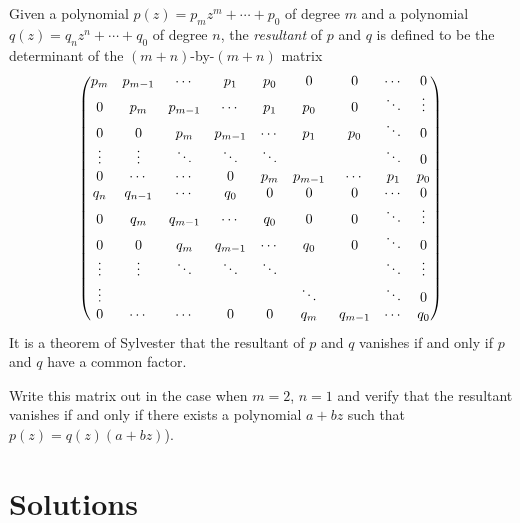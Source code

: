 \documentclass{article}
\begin{document}
\begin{Exercise}
Given a polynomial \(p(z)=p_mz^m+\cdots+p_0\) of degree \(m\) and a
polynomial \(q(z)=q_nz^n+\cdots+q_0\) of degree \(n\), the {\em
resultant} of \(p\) and \(q\) is defined to be the determinant of
the \((m+n)\)-by-\((m+n)\) matrix \[\begin{pmatrix} p_m & p_{m-1} & \cdots & p_1
& p_0 & 0 & 0 & \cdots & 0 \\ 0 & p_m & p_{m-1} & \cdots & p_1 & p_0
& 0 & \ddots & \vdots \\ 0 & 0 & p_m & p_{m-1} & \cdots & p_1 & p_0
& \ddots & 0 \\ \vdots & \vdots & \ddots & \ddots & \ddots & & &
\ddots & 0 \\ 0 & \cdots & \cdots & 0 & p_m & p_{m-1} & \cdots & p_1
& p_0 \\ q_n & q_{n-1} & \cdots & q_0 & 0 & 0 & 0 & \cdots & 0 \\ 0
& q_m & q_{m-1} & \cdots & q_0 & 0 & 0 & \ddots & \vdots \\ 0 & 0 &
q_m & q_{m-1} & \cdots & q_0 & 0 & \ddots & 0 \\ \vdots & \vdots &
\ddots & \ddots & \ddots & & & \ddots & \vdots
\\ \vdots&&&&&\ddots&&\ddots&0\\ 0 & \cdots & \cdots & 0 & 0 & q_m &
q_{m-1} & \cdots & q_0 \end{pmatrix}\] It is a theorem of Sylvester that the
resultant of \(p\) and \(q\) vanishes if and only if \(p\) and \(q\)
have a common factor.


Write this matrix out in the case when \(m=2\), \(n=1\) and verify
that the resultant vanishes if and only if there exists a polynomial
\(a+bz\) such that \(p(z)=q(z)(a+bz)\)).


\end{Exercise}
\newpage


\section{Solutions}
\end{document}
